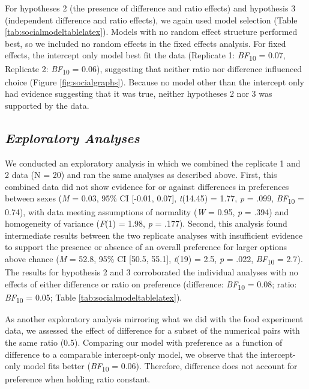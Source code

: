 \documentclass[
  ,pub,floatsintext]{apa6}
\begin{document}
For hypotheses 2 (the presence of difference and ratio effects) and hypothesis 3 (independent difference and ratio effects), we again used model selection (Table \ref{tab:socialmodeltablelatex}). Models with no random effect structure performed best, so we included no random effects in the fixed effects analysis. For fixed effects, the intercept only model best fit the data (Replicate 1: \emph{BF}\textsubscript{10} = 0.07, Replicate 2: \emph{BF}\textsubscript{10} = 0.06), suggesting that neither ratio nor difference influenced choice (Figure \ref{fig:socialgraphs}). Because no model other than the intercept only had evidence suggesting that it was true, neither hypotheses 2 nor 3 was supported by the data.

\hypertarget{exploratory-analyses-1}{%
\subsection{\texorpdfstring{\emph{Exploratory Analyses}}{Exploratory Analyses}}\label{exploratory-analyses-1}}

We conducted an exploratory analysis in which we combined the replicate 1 and 2 data (N = 20) and ran the same analyses as described above. First, this combined data did not show evidence for or against differences in preferences between sexes (\emph{M} = 0.03, 95\% CI {[}-0.01, 0.07{]}, \emph{t}(14.45) = 1.77, \emph{p} = .099, \emph{BF}\textsubscript{10} = 0.74), with data meeting assumptions of normality (\emph{W} = 0.95, \emph{p} = .394) and homogeneity of variance (\emph{F}(1) = 1.98, \emph{p} = .177). Second, this analysis found intermediate results between the two replicate analyses with insufficient evidence to support the presence or absence of an overall preference for larger options above chance (\emph{M} = 52.8, 95\% CI {[}50.5, 55.1{]}, \emph{t}(19) = 2.5, \emph{p} = .022, \emph{BF}\textsubscript{10} = 2.7). The results for hypothesis 2 and 3 corroborated the individual analyses with no effects of either difference or ratio on preference (difference: \emph{BF}\textsubscript{10} = 0.08; ratio: \emph{BF}\textsubscript{10} = 0.05; Table \ref{tab:socialmodeltablelatex}).

As another exploratory analysis mirroring what we did with the food experiment data, we assessed the effect of difference for a subset of the numerical pairs with the same ratio (0.5). Comparing our model with preference as a function of difference to a comparable intercept-only model, we observe that the intercept-only model fits better (\emph{BF}\textsubscript{10} = 0.06). Therefore, difference does not account for preference when holding ratio constant.
\end{document}
